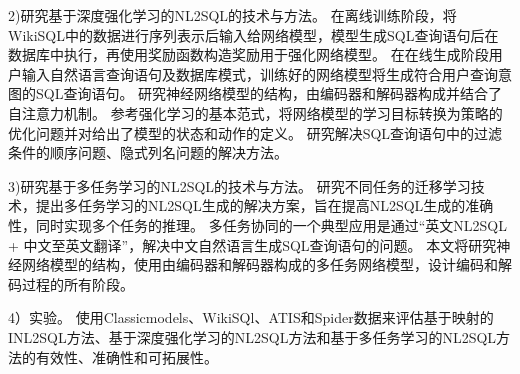 2)研究基于深度强化学习的NL2SQL的技术与方法。
在离线训练阶段，将WikiSQL中的数据进行序列表示后输入给网络模型，模型生成SQL查询语句后在数据库中执行，再使用奖励函数构造奖励用于强化网络模型。
在在线生成阶段用户输入自然语言查询语句及数据库模式，训练好的网络模型将生成符合用户查询意图的SQL查询语句。
研究神经网络模型的结构，由编码器和解码器构成并结合了自注意力机制。
参考强化学习的基本范式，将网络模型的学习目标转换为策略的优化问题并对给出了模型的状态和动作的定义。
研究解决SQL查询语句中的过滤条件的顺序问题、隐式列名问题的解决方法。

3)研究基于多任务学习的NL2SQL的技术与方法。
研究不同任务的迁移学习技术，提出多任务学习的NL2SQL生成的解决方案，旨在提高NL2SQL生成的准确性，同时实现多个任务的推理。
多任务协同的一个典型应用是通过“英文NL2SQL + 中文至英文翻译”，解决中文自然语言生成SQL查询语句的问题。
本文将研究神经网络模型的结构，使用由编码器和解码器构成的多任务网络模型，设计编码和解码过程的所有阶段。

4）实验。
使用Classicmodels、WikiSQl、ATIS和Spider数据来评估基于映射的INL2SQL方法、基于深度强化学习的NL2SQL方法和基于多任务学习的NL2SQL方法的有效性、准确性和可拓展性。



